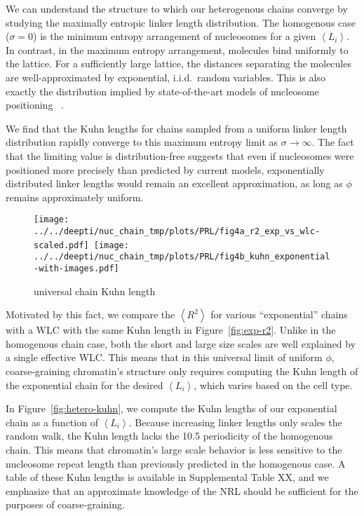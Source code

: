 \documentclass[%
 reprint,
superscriptaddress,
showpacs,preprintnumbers,
 amsmath,amssymb,
 aps,
 prl,
]{revtex4-1}
\newcommand{\RR}{\left\langle{}R^2\right\rangle{}}
\newcommand{\meanli}{\left\langle{}L_i\right\rangle}
\begin{document}
We can understand the structure to which our heterogenous chains converge by studying the
maximally entropic linker length distribution. The homogenous case ($\sigma=0$) is the
    minimum entropy arrangement of nucleosomes for a given $\meanli$. In
    contrast, in the maximum entropy arrangement, molecules bind uniformly to
    the lattice. For a sufficiently large lattice, the distances separating the
    molecules are well-approximated by exponential, i.i.d.\ random variables.
This is also exactly the distribution implied by  state-of-the-art models of nucleosome
    positioning ~\cite{beshnova2014}.

We find that the Kuhn lengths for chains sampled from a
uniform linker length distribution rapidly converge to this
maximum entropy limit as $\sigma\to\infty$.  
The fact that the limiting value is distribution-free suggests that even if nucleosomes were  positioned more precisely than predicted by current models, exponentially distributed linker lengths would remain an excellent approximation, as long as $\phi$ remains approximately uniform.

\begin{figure}
    \centering
    \mbox{\texttt{[image: ../../deepti/nuc\_chain\_tmp/plots/PRL/fig4a\_r2\_exp\_vs\_wlc-scaled.pdf]}
    \texttt{[image: ../../deepti/nuc\_chain\_tmp/plots/PRL/fig4b\_kuhn\_exponential-with-images.pdf]}}
    \caption{universal chain Kuhn length}\label{fig:exp-chain}
\end{figure}


Motivated by this fact, we compare the $\RR$ for various
    ``exponential'' chains  with a WLC with the same Kuhn length in Figure~\ref{fig:exp-r2}.
Unlike in the homogenous chain case, both the short and large size scales are
    well explained by a single effective WLC.\@
This means that in this universal limit of uniform $\phi$, coarse-graining
    chromatin's structure only requires  computing the Kuhn length of the
    exponential chain for the desired $\meanli$, which varies based on the cell
    type.

In Figure~\ref{fig:hetero-kuhn}, we compute the Kuhn lengths of our exponential
    chain as a function of $\meanli$.
Because increasing linker lengths only scales the random walk, the Kuhn length
    lacks the \SI{10.5}{\basepair} periodicity of the homogenous chain.
This means that chromatin's large scale behavior is less sensitive to
    the nucleosome repeat length than previously predicted in the homogenous
    case.
A table of these Kuhn lengths is available in Supplemental Table XX, and we
    emphasize that an approximate knowledge of the NRL should be sufficient for
    the purposes of coarse-graining.
\end{document}
